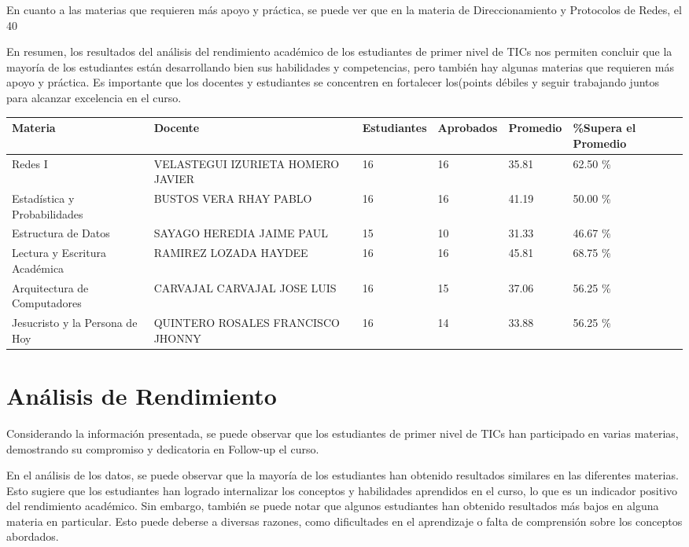 En cuanto a las materias que requieren más apoyo y práctica, se puede ver que en la materia de Direccionamiento y Protocolos de Redes, el 40%

En resumen, los resultados del análisis del rendimiento académico de los estudiantes de primer nivel de TICs nos permiten concluir que la mayoría de los estudiantes están desarrollando bien sus habilidades y competencias, pero también hay algunas materias que requieren más apoyo y práctica. Es importante que los docentes y estudiantes se concentren en fortalecer los(points débiles y seguir trabajando juntos para alcanzar excelencia en el curso.\\
\vspace{1cm}\small
\begin{tabularx}{\textwidth}{|p{2.5cm}|p{2.5cm}|X|X|X|X|}
\hline
\textbf{Materia} & \textbf{Docente} & \textbf{Estudiantes} & \textbf{Aprobados} & \textbf{Promedio} & \textbf{\%Supera el Promedio} \\ \hline
Redes I & VELASTEGUI IZURIETA HOMERO JAVIER & 16 & 16 & 35.81 & 62.50 \%\\ \hline
Estadística y Probabilidades & BUSTOS VERA RHAY PABLO & 16 & 16 & 41.19 & 50.00 \%\\ \hline
Estructura de Datos & SAYAGO HEREDIA JAIME PAUL & 15 & 10 & 31.33 & 46.67 \%\\ \hline
Lectura y Escritura Académica & RAMIREZ LOZADA HAYDEE  & 16 & 16 & 45.81 & 68.75 \%\\ \hline
Arquitectura de Computadores & CARVAJAL CARVAJAL JOSE LUIS & 16 & 15 & 37.06 & 56.25 \%\\ \hline
Jesucristo y la Persona de Hoy & QUINTERO ROSALES FRANCISCO JHONNY & 16 & 14 & 33.88 & 56.25 \%\\ \hline
\end{tabularx}

\vspace{1cm}
\section{Análisis de Rendimiento}
Considerando la información presentada, se puede observar que los estudiantes de primer nivel de TICs han participado en varias materias, demostrando su compromiso y dedicatoria en Follow-up el curso.

En el análisis de los datos, se puede observar que la mayoría de los estudiantes han obtenido resultados similares en las diferentes materias. Esto sugiere que los estudiantes han logrado internalizar los conceptos y habilidades aprendidos en el curso, lo que es un indicador positivo del rendimiento académico. Sin embargo, también se puede notar que algunos estudiantes han obtenido resultados más bajos en alguna materia en particular. Esto puede deberse a diversas razones, como dificultades en el aprendizaje o falta de comprensión sobre los conceptos abordados.

